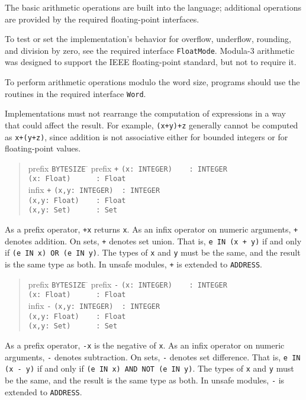 \documentclass[10pt]{article}
\begin{document}
The basic arithmetic operations are built into the language; additional
operations are provided by the required floating-point interfaces.

To test or set the implementation's behavior for overflow, underflow,
rounding, and division by zero, see the required interface \verb|FloatMode|.
Modula-3 arithmetic was designed to support the IEEE floating-point standard,
but not to require it.

To perform arithmetic operations modulo the word size, programs should use the
routines in the required interface \verb|Word|.

Implementations must not rearrange the computation of expressions in a way
that could affect the result.  For example, \verb|(x+y)+z| generally cannot be
computed as \verb|x+(y+z)|, since addition is not associative either for
bounded integers or for floating-point values.

\begin{quote}
  \begin{tabbing}
    prefix \= \verb|BYTESIZE| \= \kill
    prefix \> \verb|+|       \> \verb|(x: INTEGER)    : INTEGER| \\
           \>                \> \verb|(x: Float)      : Float| \\
    infix  \> \verb|+|       \> \verb|(x,y: INTEGER)  : INTEGER| \\
           \>                \> \verb|(x,y: Float)    : Float| \\
           \>                \> \verb|(x,y: Set)      : Set|
  \end{tabbing}
\end{quote}
As a prefix operator, \verb|+x| returns \verb|x|.  As an infix operator on
numeric arguments, \verb|+| denotes addition.  On sets, \verb|+| denotes set
union.  That is, \verb|e IN (x + y)| if and only if
\verb|(e IN x) OR (e IN y)|.  The types of \verb|x| and \verb|y| must be the
same, and the result is the same type as both.  In unsafe modules, \verb|+| is
extended to \verb|ADDRESS|.

\begin{quote}
  \begin{tabbing}
    prefix \= \verb|BYTESIZE| \= \kill
    prefix \> \verb|-|       \> \verb|(x: INTEGER)    : INTEGER| \\
           \>                \> \verb|(x: Float)      : Float| \\
    infix  \> \verb|-|       \> \verb|(x,y: INTEGER)  : INTEGER| \\
           \>                \> \verb|(x,y: Float)    : Float| \\
           \>                \> \verb|(x,y: Set)      : Set|
  \end{tabbing}
\end{quote}
As a prefix operator, \verb|-x| is the negative of \verb|x|.  As an infix
operator on numeric arguments, \verb|-| denotes subtraction.  On sets,
\verb|-| denotes set difference.  That is, \verb|e IN (x - y)| if and only if
\verb|(e IN x) AND NOT (e IN y)|.  The types of \verb|x| and \verb|y| must be
the same, and the result is the same type as both.  In unsafe modules,
\verb|-| is extended to \verb|ADDRESS|.
\end{document}
